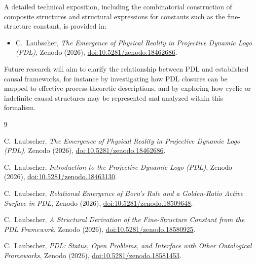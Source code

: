 \documentclass[11pt,a4paper]{article}
\begin{document}
A detailed technical exposition, including the combinatorial construction of composite structures and structural expressions for constants such as the fine-structure constant, is provided in:
\begin{itemize}
    \item C.\ Laubscher, \emph{The Emergence of Physical Reality in Projective Dynamic Logo (PDL)}, Zenodo (2026), \href{https://doi.org/10.5281/zenodo.18462686}{doi:10.5281/zenodo.18462686}.
\end{itemize}

Future research will aim to clarify the relationship between PDL and established causal frameworks, for instance by investigating how PDL closures can be mapped to effective process-theoretic descriptions, and by exploring how cyclic or indefinite causal structures may be represented and analyzed within this formalism.

\begin{thebibliography}{9}

C.~Laubscher,
\newblock \emph{The Emergence of Physical Reality in Projective Dynamic Logo (PDL)},
\newblock Zenodo (2026),
\newblock \href{https://doi.org/10.5281/zenodo.18462686}{doi:10.5281/zenodo.18462686}.

C.~Laubscher,
\newblock \emph{Introduction to the Projective Dynamic Logo (PDL)},
\newblock Zenodo (2026),
\newblock \href{https://doi.org/10.5281/zenodo.18463130}{doi:10.5281/zenodo.18463130}.

C.~Laubscher,
\newblock \emph{Relational Emergence of Born's Rule and a Golden-Ratio Active Surface in PDL},
\newblock Zenodo (2026),
\newblock \href{https://doi.org/10.5281/zenodo.18509648}{doi:10.5281/zenodo.18509648}.

C.~Laubscher,
\newblock \emph{A Structural Derivation of the Fine-Structure Constant from the PDL Framework},
\newblock Zenodo (2026),
\newblock \href{https://doi.org/10.5281/zenodo.18580925}{doi:10.5281/zenodo.18580925}.

C.~Laubscher,
\newblock \emph{PDL: Status, Open Problems, and Interface with Other Ontological Frameworks},
\newblock Zenodo (2026),
\newblock \href{https://doi.org/10.5281/zenodo.18581453}{doi:10.5281/zenodo.18581453}.

\end{thebibliography}
\end{document}
